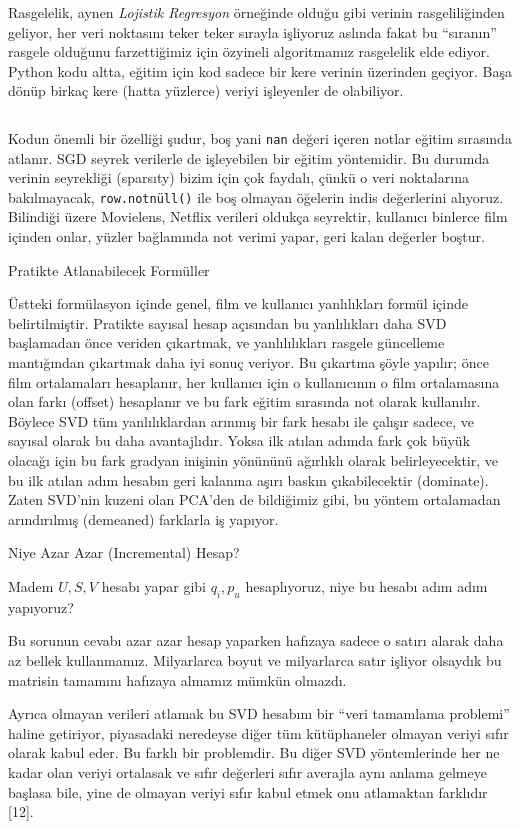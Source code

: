 \documentclass[12pt,fleqn]{article}\usepackage{../../common}
\begin{document}
Rasgelelik, aynen {\em Lojistik Regresyon} örneğinde olduğu gibi verinin
rasgeliliğinden geliyor, her veri noktasını teker teker sırayla işliyoruz
aslında fakat bu ``sıranın'' rasgele olduğunu farzettiğimiz için özyineli
algoritmamız rasgelelik elde ediyor. Python kodu altta, eğitim için kod sadece
bir kere verinin üzerinden geçiyor. Başa dönüp birkaç kere (hatta yüzlerce)
veriyi işleyenler de olabiliyor.

\inputminted[fontsize=\footnotesize]{python}{ssvd.py}

Kodun önemli bir özelliği şudur, boş yani \verb!nan! değeri içeren notlar eğitim
sırasında atlanır. SGD seyrek verilerle de işleyebilen bir eğitim yöntemidir. Bu
durumda verinin seyrekliği (sparsıty) bizim için çok faydalı, çünkü o veri
noktalarına bakılmayacak, \verb!row.notnüll()! ile boş olmayan öğelerin indis
değerlerini alıyoruz. Bilindiği üzere Movielens, Netflix verileri oldukça
seyrektir, kullanıcı binlerce film içinden onlar, yüzler bağlamında not verimi
yapar, geri kalan değerler boştur.

Pratikte Atlanabilecek Formüller

Üstteki formülasyon içinde genel, film ve kullanıcı yanlılıkları formül içinde
belirtilmiştir. Pratikte sayısal hesap açısından bu yanlılıkları daha SVD
başlamadan önce veriden çıkartmak, ve yanlılılıkları rasgele güncelleme
mantığından çıkartmak daha iyi sonuç veriyor. Bu çıkartma şöyle yapılır; önce
film ortalamaları hesaplanır, her kullanıcı için o kullanıcının o film
ortalamasına olan farkı (offset) hesaplanır ve bu fark eğitim sırasında not
olarak kullanılır. Böylece SVD tüm yanlılıklardan arınmış bir fark hesabı ile
çalışır sadece, ve sayısal olarak bu daha avantajlıdır. Yoksa ilk atılan adımda
fark çok büyük olacağı için bu fark gradyan inişinin yönününü ağırlıklı olarak
belirleyecektir, ve bu ilk atılan adım hesabın geri kalanına aşırı baskın
çıkabilecektir (dominate). Zaten SVD'nin kuzeni olan PCA'den de bildiğimiz gibi,
bu yöntem ortalamadan arındırılmış (demeaned) farklarla iş yapıyor.

Niye Azar Azar (Incremental) Hesap? 

Madem $U,S,V$ hesabı yapar gibi $q_i,p_u$ hesaplıyoruz, niye bu hesabı adım
adım yapıyoruz? 

Bu sorunun cevabı azar azar hesap yaparken hafızaya sadece o satırı alarak daha
az bellek kullanmamız. Milyarlarca boyut ve milyarlarca satır işliyor olsaydık
bu matrisin tamamını hafızaya almamız mümkün olmazdı.

Ayrıca olmayan verileri atlamak bu SVD hesabını bir ``veri tamamlama problemi''
haline getiriyor, piyasadaki neredeyse diğer tüm kütüphaneler olmayan veriyi
sıfır olarak kabul eder. Bu farklı bir problemdir. Bu diğer SVD yöntemlerinde
her ne kadar olan veriyi ortalasak ve sıfır değerleri sıfır averajla aynı anlama
gelmeye başlasa bile, yine de olmayan veriyi sıfır kabul etmek onu atlamaktan
farklıdır [12].
\end{document}
